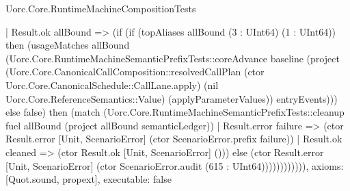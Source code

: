 \begin{lexlean}{Uorc.Core.RuntimeMachineCompositionTests}
\begin{semanticmodule}
{                | Result.ok allBound => (if (if (topAliases allBound (3 : UInt64) (1 : UInt64)) then (usageMatches allBound (Uorc.Core.RuntimeMachineSemanticPrefixTests::coreAdvance baseline (project (Uorc.Core.CanonicalCallComposition::resolvedCallPlan (ctor Uorc.Core.CanonicalSchedule::CallLane.apply) (nil Uorc.Core.ReferenceSemantics::Value) (applyParameterValues)) entryEvents))) else false) then (match (Uorc.Core.RuntimeMachineSemanticPrefixTests::cleanup fuel allBound (project allBound semanticLedger))
                  | Result.error failure => (ctor Result.error [Unit, ScenarioError] (ctor ScenarioError.prefix failure))
                  | Result.ok cleaned => (ctor Result.ok [Unit, ScenarioError] ())) else (ctor Result.error [Unit, ScenarioError] (ctor ScenarioError.audit (615 : UInt64)))))))))))),
  axioms: [Quot.sound, propext],
  executable: false
}


\end{semanticmodule}
\end{lexlean}

